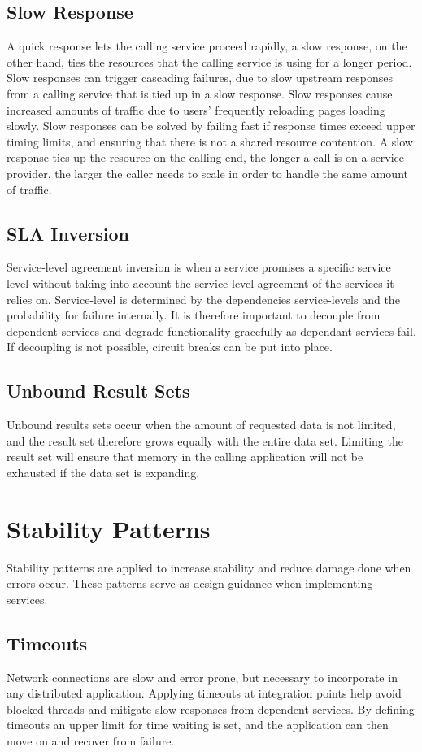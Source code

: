 \subsection{Slow Response}
A quick response lets the calling service proceed rapidly, a slow response, on the other hand, ties the resources that the calling service is using for a longer period. Slow responses can trigger cascading failures, due to slow upstream responses from a calling service that is tied up in a slow response. Slow responses cause increased amounts of traffic due to users' frequently reloading pages loading slowly. Slow responses can be solved by failing fast if response times exceed upper timing limits, and ensuring that there is not a shared resource contention.
A slow response ties up the resource on the calling end, the longer a call is on a service provider, the larger the caller needs to scale in order to handle the same amount of traffic.


\subsection{SLA Inversion}
Service-level agreement inversion is when a service promises a specific service level without taking into account the service-level agreement of the services it relies on. Service-level is determined by the dependencies service-levels and the probability for failure internally. It is therefore important to decouple from dependent services and degrade functionality gracefully as dependant services fail. If decoupling is not possible, circuit breaks can be put into place. 


\subsection{Unbound Result Sets}
Unbound results sets occur when the amount of requested data is not limited, and the result set therefore grows equally with the entire data set. Limiting the result set will ensure that memory in the calling application will not be exhausted if the data set is expanding.


\section{Stability Patterns}
Stability patterns are applied to increase stability and reduce damage done when errors occur. These patterns serve as design guidance when implementing services.


\subsection{Timeouts}
Network connections are slow and error prone, but necessary to incorporate in any distributed application. Applying timeouts at integration points help avoid blocked threads and mitigate slow responses from dependent services. By defining timeouts an upper limit for time waiting is set, and the application can then move on and recover from failure.


